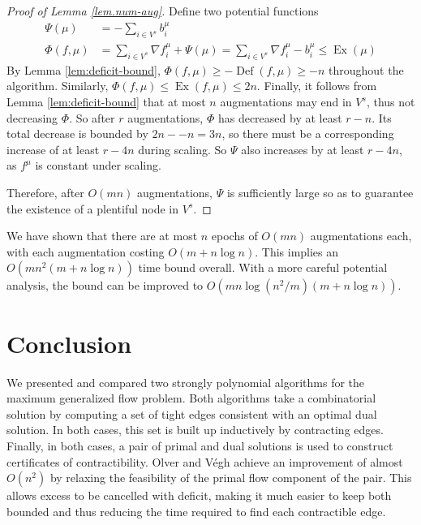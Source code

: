 \documentclass[11pt]{article}
\theoremstyle{definition}
\theoremstyle{definition}
\theoremstyle{definition}
\newcommand{\fu}{f^{\mu}}
\newcommand{\nfiu}{\nabla \fu_i}
\newcommand{\biu}{b_{i}^{\mu}}
\newcommand{\vsrc}{V^{s}}
\DeclareMathOperator{\Ex}{Ex}
\DeclareMathOperator{\Def}{Def}
\begin{document}
    \begin{proof}[Proof of Lemma \ref{lem.num-aug}]
    Define two potential functions
    \begin{align*}
    \Psi(\mu) &= - \sum_{i \in \vsrc} \biu \\
    \Phi(f, \mu) &= \sum_{i \in \vsrc} \nfiu + \Psi(\mu) = \sum_{i \in \vsrc} \nfiu - \biu
                 \leq \Ex(\mu)
    \end{align*}
    By Lemma \ref{lem:deficit-bound}, $\Phi(f, \mu) \geq -\Def(f, \mu) \geq -n$
    throughout the algorithm. Similarly, $\Phi(f, \mu) \leq \Ex(f, \mu) \leq 2n$.
    Finally, it follows from Lemma \ref{lem:deficit-bound} that at most $n$ augmentations
    may end in $\vsrc$, thus not decreasing $\Phi$. So after $r$ augmentations,
    $\Phi$ has decreased by at least $r - n$. Its total decrease is bounded by $2n - -n = 3n$,
    so there must be a corresponding increase of at least $r - 4n$ during scaling. So
    $\Psi$ also increases by at least $r - 4n$, as $f^\mu$ is constant under scaling.
    
    Therefore, after $O(mn)$ augmentations, $\Psi$ is sufficiently large so as to guarantee
    the existence of a plentiful node in $V^s$.
    \end{proof}
    We have shown that there are at most $n$ epochs of $O(mn)$ augmentations each, with
    each augmentation costing $O(m + n\log n)$. This implies an $O(mn^2(m + n\log n))$
    time bound overall. With a more careful potential analysis, the bound can be improved
    to $O(mn\log(n^2/m)(m + n \log n))$.


\section{Conclusion}\label{sec:discussion} 

We presented and compared two strongly polynomial algorithms for the maximum generalized flow problem.
Both algorithms take a combinatorial solution by computing a set of tight edges consistent
with an optimal dual solution. In both cases, this set is built up inductively by
contracting edges. Finally, in both cases, a pair of primal and dual solutions is used to
construct certificates of contractibility.
Olver and Végh \cite{Olver2017} achieve an improvement of almost $O(n^2)$ by relaxing the
feasibility of the primal flow component of the pair. This allows excess to be cancelled with deficit,
making it much easier to keep both bounded and thus reducing the time required to find each
contractible edge.
\end{document}
